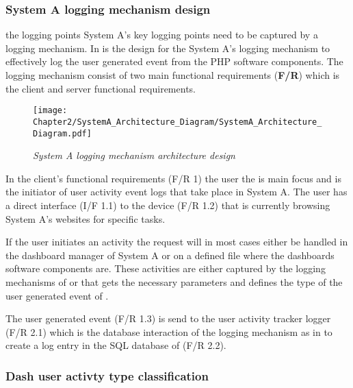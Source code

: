 \subsubsection{System A logging mechanism design}
 the logging points System A's key logging points need to be captured by a logging mechanism. In  is the design for the System A's logging mechanism to effectively log the user generated event from the PHP software components. The logging mechanism consist of two main functional requirements (\textbf{F/R}) which is the client and server functional requirements.

\begin{figure}[!htb] %
	\centering %
	\texttt{[image: Chapter2/SystemA\_Architecture\_Diagram/SystemA\_Architecture\_Diagram.pdf]}
	\caption[System A logging mechanism architecture design]
	{\textit{System A logging mechanism architecture design}}\label{fig:ch2_SystemA_Arch_Design}
\end{figure}

In the client's functional requirements (F/R 1) the user the is main focus and is the initiator of user activity event logs that take place in System A. The user has a direct interface (I/F 1.1) to the device (F/R 1.2) that is currently browsing System A's websites for specific tasks.\par If the user initiates an activity the request will in most cases either be handled in the dashboard manager of System A or on a defined file where the dashboards software components are. These activities are either captured by the logging mechanisms of  or  that gets the necessary parameters and defines the type of the user generated event of . \par The user generated event (F/R 1.3) is send to the user activity tracker logger (F/R 2.1) which is the database interaction of the logging mechanism as in  to create a log entry in the SQL database of (F/R 2.2).

\subsubsection{Dash user activty type classification}

